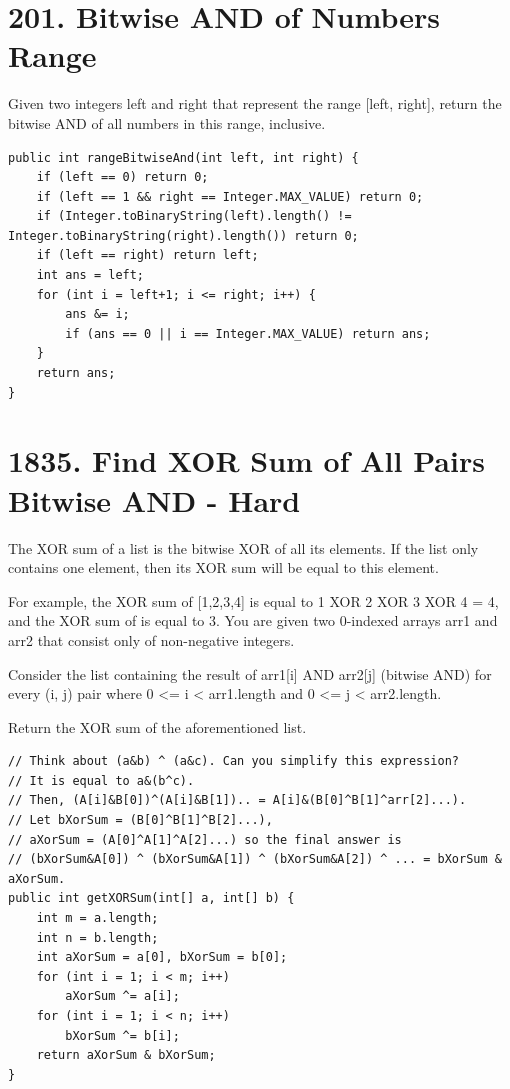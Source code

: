 \documentclass[9pt, b5paaper]{book}
\begin{document}
\section{201. Bitwise AND of Numbers Range}
\label{sec-10-4}
Given two integers left and right that represent the range [left, right], return the bitwise AND of all numbers in this range, inclusive.
\begin{verbatim}
public int rangeBitwiseAnd(int left, int right) {
    if (left == 0) return 0;
    if (left == 1 && right == Integer.MAX_VALUE) return 0;
    if (Integer.toBinaryString(left).length() != Integer.toBinaryString(right).length()) return 0;
    if (left == right) return left;
    int ans = left;
    for (int i = left+1; i <= right; i++) {
        ans &= i;
        if (ans == 0 || i == Integer.MAX_VALUE) return ans;
    }
    return ans;
}
\end{verbatim}

\section{1835. Find XOR Sum of All Pairs Bitwise AND - Hard}
\label{sec-10-5}
The XOR sum of a list is the bitwise XOR of all its elements. If the list only contains one element, then its XOR sum will be equal to this element.

For example, the XOR sum of [1,2,3,4] is equal to 1 XOR 2 XOR 3 XOR 4 = 4, and the XOR sum of \footnotemark[1]{} is equal to 3.
You are given two 0-indexed arrays arr1 and arr2 that consist only of non-negative integers.

Consider the list containing the result of arr1[i] AND arr2[j] (bitwise AND) for every (i, j) pair where 0 <= i < arr1.length and 0 <= j < arr2.length.

Return the XOR sum of the aforementioned list.
\begin{verbatim}
// Think about (a&b) ^ (a&c). Can you simplify this expression?
// It is equal to a&(b^c).
// Then, (A[i]&B[0])^(A[i]&B[1]).. = A[i]&(B[0]^B[1]^arr[2]...).
// Let bXorSum = (B[0]^B[1]^B[2]...),
// aXorSum = (A[0]^A[1]^A[2]...) so the final answer is
// (bXorSum&A[0]) ^ (bXorSum&A[1]) ^ (bXorSum&A[2]) ^ ... = bXorSum & aXorSum.
public int getXORSum(int[] a, int[] b) {
    int m = a.length;
    int n = b.length;
    int aXorSum = a[0], bXorSum = b[0];
    for (int i = 1; i < m; i++) 
        aXorSum ^= a[i];
    for (int i = 1; i < n; i++) 
        bXorSum ^= b[i];
    return aXorSum & bXorSum;
}
\end{verbatim}
\end{document}
